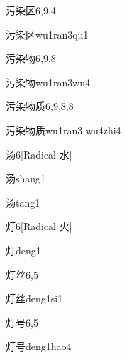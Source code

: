\begin{entry}{污染区}{6,9,4}
  \begin{phonetics}{污染区}{wu1ran3qu1}
  \end{phonetics}
\end{entry}

\begin{entry}{污染物}{6,9,8}
  \begin{phonetics}{污染物}{wu1ran3wu4}
  \end{phonetics}
\end{entry}

\begin{entry}{污染物质}{6,9,8,8}
  \begin{phonetics}{污染物质}{wu1ran3 wu4zhi4}
  \end{phonetics}
\end{entry}

\begin{entry}{汤}{6}[Radical 水]
  \begin{phonetics}{汤}{shang1}
  \end{phonetics}
  \begin{phonetics}{汤}{tang1}
  \end{phonetics}
\end{entry}

\begin{entry}{灯}{6}[Radical 火]
  \begin{phonetics}{灯}{deng1}
  \end{phonetics}
\end{entry}

\begin{entry}{灯丝}{6,5}
  \begin{phonetics}{灯丝}{deng1si1}
  \end{phonetics}
\end{entry}

\begin{entry}{灯号}{6,5}
  \begin{phonetics}{灯号}{deng1hao4}
  \end{phonetics}
\end{entry}

